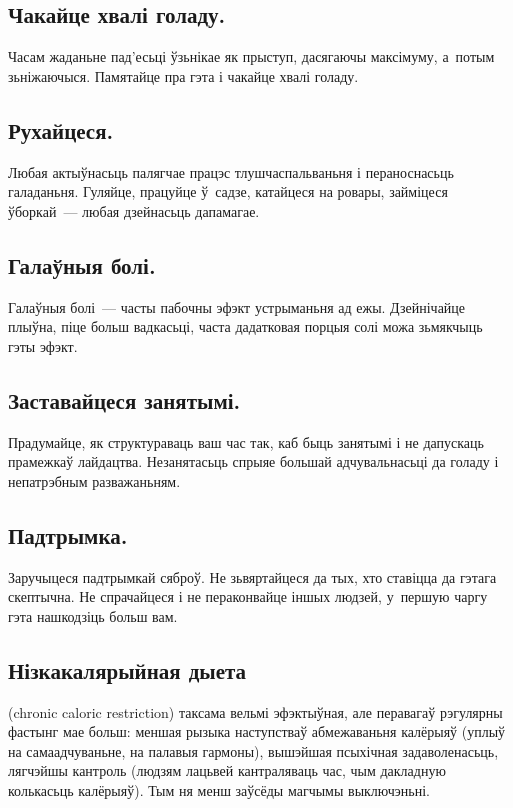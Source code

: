 
\subsection{Чакайце хвалі голаду.}
Часам жаданьне пад'есьці ўзьнікае як прыступ, дасягаючы максімуму, а~потым зьніжаючыся. Памятайце пра гэта і чакайце хвалі голаду.

\subsection{Рухайцеся.}
Любая актыўнасьць палягчае працэс тлушчаспальваньня і пераноснасьць галаданьня. Гуляйце, працуйце ў~садзе, катайцеся на ровары, займіцеся ўборкай~--- любая дзейнасьць дапамагае.

\subsection{Галаўныя болі.}
Галаўныя болі~--- часты пабочны эфэкт устрыманьня ад ежы. Дзейнічайце плыўна, піце больш вадкасьці, часта дадатковая порцыя солі можа зьмякчыць гэты эфэкт.

\subsection{Заставайцеся занятымі.}
Прадумайце, як структураваць ваш час так, каб быць занятымі і не дапускаць прамежкаў лайдацтва. Незанятасьць спрыяе большай адчувальнасьці да голаду і непатрэбным разважаньням.

\subsection{Падтрымка.}
Заручыцеся падтрымкай сяброў. Не зьвяртайцеся да тых, хто ставіцца да гэтага скептычна. Не спрачайцеся і не пераконвайце іншых людзей, у~першую чаргу гэта нашкодзіць больш вам.

\subsection{Нізкакалярыйная дыета} (chronic caloric restriction) таксама вельмі эфэктыўная, але перавагаў рэгулярны фастынг мае больш: меншая рызыка наступстваў абмежаваньня калёрыяў (уплыў на самаадчуваньне, на палавыя гармоны), вышэйшая псыхічная задаволенасьць, лягчэйшы кантроль (людзям лацьвей кантраляваць час, чым дакладную колькасьць калёрыяў). Тым ня менш заўсёды магчымы выключэньні.

